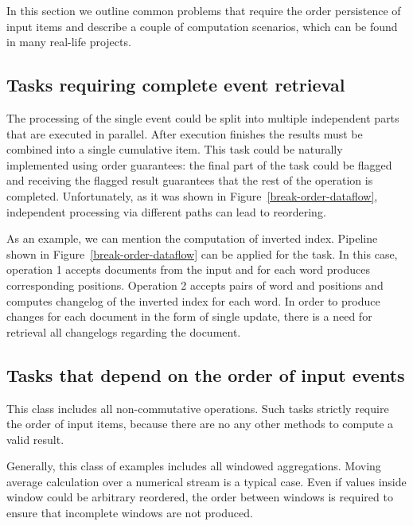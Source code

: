 
\label {fs-tasks}

In this section we outline common problems that require the order persistence of input items and describe a couple of computation scenarios, which can be found in many real-life projects.

\subsection{Tasks requiring complete event retrieval}
The processing of the single event could be split into multiple independent parts that are executed in parallel. After execution finishes the results must be combined into a single cumulative item. This task could be naturally implemented using order guarantees: the final part of the task could be flagged and receiving the flagged result guarantees that the rest of the operation is completed. Unfortunately, as it was shown in Figure~\ref{break-order-dataflow}, independent processing via different paths can lead to reordering.

As an example, we can mention the computation of inverted index. Pipeline shown in Figure~\ref{break-order-dataflow} can be applied for the task. In this case, operation 1 accepts documents from the input and for each word produces corresponding positions. Operation 2 accepts pairs of word and positions and computes changelog of the inverted index for each word. In order to produce changes for each document in the form of single update, there is a need for retrieval all changelogs regarding the document.

\subsection{Tasks that depend on the order of input events}
This class includes all non-commutative operations. Such tasks strictly require the order of input items, because there are no any other methods to compute a valid result.

Generally, this class of examples includes all windowed aggregations. Moving average calculation over a numerical stream is a typical case. Even if values inside window could be arbitrary reordered, the order between windows is required to ensure that incomplete windows are not produced.
